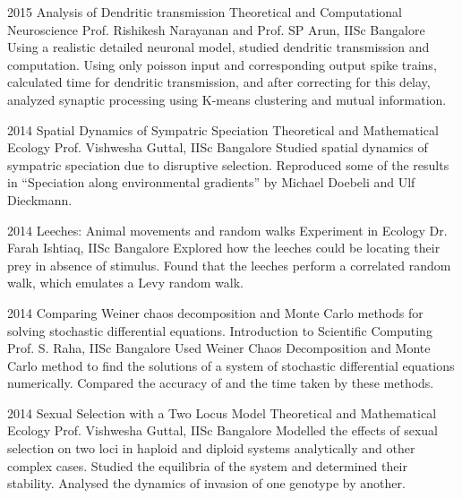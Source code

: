 \documentclass[11pt,print]{friggeri-cv}%
\begin{document}
\begin{entrylist}
\entry
    {2015}
    {Analysis of Dendritic transmission}
    {Theoretical and Computational Neuroscience}
    {
    Prof. Rishikesh Narayanan and Prof. SP Arun, IISc Bangalore}
    {Using a realistic detailed neuronal model, studied dendritic transmission and computation. Using only poisson input and corresponding output spike trains, calculated time for dendritic transmission, and after correcting for this delay, analyzed synaptic processing using K-means clustering and mutual information.}    
\end{entrylist}
\begin{entrylist}
\entry
    {2014}
    {Spatial Dynamics of Sympatric Speciation}
    {Theoretical and Mathematical Ecology}
    {
    Prof. Vishwesha Guttal, IISc Bangalore}
    {Studied spatial dynamics of sympatric speciation due to disruptive selection. Reproduced some of the results in ``Speciation along environmental gradients'' by Michael Doebeli and Ulf Dieckmann.
    }    
\end{entrylist}
\begin{entrylist}
\entry
    {2014}
    {Leeches:
Animal movements and random walks}
    {Experiment in Ecology}
    {
    Dr. Farah Ishtiaq, IISc Bangalore}
    {Explored how the leeches could be locating their prey in absence of stimulus. Found that the leeches perform a correlated random walk, which emulates a Levy random walk.
    }    
\end{entrylist}
\begin{entrylist}
  \entry
    {2014}
    {Comparing Weiner chaos decomposition and Monte Carlo methods for solving stochastic differential equations.}
    {Introduction to Scientific Computing}
    {
    Prof. S. Raha, IISc Bangalore}
    {Used Weiner Chaos Decomposition and Monte Carlo method to find the solutions of a system of stochastic differential equations numerically. Compared the accuracy  of and the time taken by these methods.
    }    
\end{entrylist}
\begin{entrylist}
\entry
    {2014}
    {Sexual Selection with a Two Locus Model}
    {Theoretical and Mathematical Ecology}
    {
    Prof. Vishwesha Guttal, IISc Bangalore}
    {Modelled the effects of sexual selection on two loci in haploid and diploid systems analytically and other complex cases. Studied the equilibria of the system and determined their stability. Analysed the dynamics of invasion of one genotype by another. 
    }    
\end{entrylist}
\end{document}
